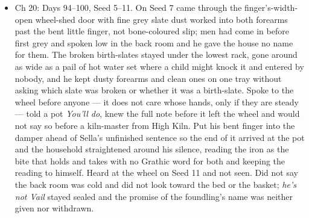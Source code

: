 \documentclass{design/chronicle}
\begin{document}
{\begin{itemize}[leftmargin=1.4em,itemsep=1pt,topsep=3pt,parsep=0pt]
\item Ch 20: Days 94–100, Seed 5–11. On Seed 7 came through the finger’s-width-open wheel-shed door with fine grey slate dust worked into both forearms past the bent little finger, not bone-coloured slip; men had come in before first grey and spoken low in the back room and he gave the house no name for them. The broken birth-slates stayed under the lowest rack, gone around as wide as a pail of hot water set where a child might knock it and entered by nobody, and he kept dusty forearms and clean ones on one tray without asking which slate was broken or whether it was a birth-slate. Spoke to the wheel before anyone --- it does not care whose hands, only if they are steady --- told a pot \emph{You’ll do}, knew the full note before it left the wheel and would not say so before a kiln-master from High Kiln. Put his bent finger into the damper ahead of Sella’s unfinished sentence so the end of it arrived at the pot and the household straightened around his silence, reading the iron as the bite that holds and takes with no Grathic word for both and keeping the reading to himself. Heard at the wheel on Seed 11 and not seen. Did not say the back room was cold and did not look toward the bed or the basket; \emph{he’s not Vail} stayed sealed and the promise of the foundling’s name was neither given nor withdrawn.

\end{itemize}
}
\end{document}
